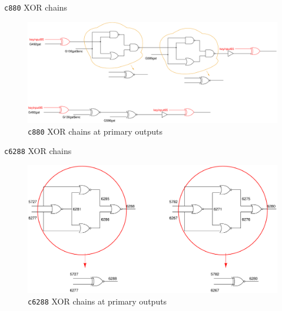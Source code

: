 \begin{frame}{\texttt{c880} XOR chains}
       \begin{figure}
                \begin{center}
                \label{fig:c880-c-l}
                \caption{\texttt{c880} XOR chains at primary outputs}
                        \includegraphics[scale=0.2]{fig/c880-xor-chains.pdf}
                \end{center}
        \end{figure}

\end{frame}

\begin{frame}{\texttt{c6288} XOR chains}
       \begin{figure}
                \begin{center}
                \label{fig:c6288-c-l}
                \caption{\texttt{c6288} XOR chains at primary outputs}
                        \includegraphics[scale=0.2]{fig/c6288-xor-chains.pdf}
                \end{center}
        \end{figure}

\end{frame}

